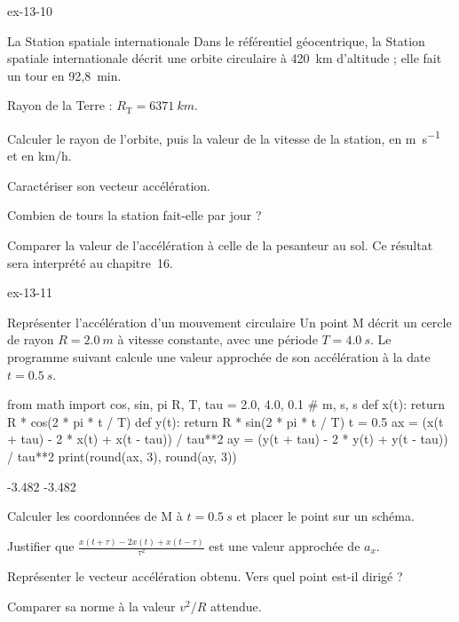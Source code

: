\begin{blocLivre}{ex-13-10}
\begin{exercice}[2]{La Station spatiale internationale}
Dans le référentiel géocentrique, la Station spatiale internationale décrit une orbite circulaire à 420~km d'altitude ;
elle fait un tour en 92,8~min.
\begin{donnees}
Rayon de la Terre : $R_\mathrm{T}=\qty{6371}{km}$.
\end{donnees}
\begin{questions}
\item Calculer le rayon de l'orbite, puis la valeur de la vitesse de la station, en \unit{m.s^{-1}} et en km/h.
\item Caractériser son vecteur accélération.
\item Combien de tours la station fait-elle par jour ?
\item Comparer la valeur de l'accélération à celle de la pesanteur au sol. Ce résultat sera interprété au chapitre~16.
\end{questions}
\end{exercice}
\end{blocLivre}
\begin{blocLivre}{ex-13-11}
\begin{exercice}[2]{Représenter l'accélération d'un mouvement circulaire}
Un point M décrit un cercle de rayon $R=\qty{2,0}{m}$ à vitesse constante, avec une période $T=\qty{4,0}{s}$. Le
programme suivant calcule une valeur approchée de son accélération à la date $t=\qty{0,5}{s}$.
\begin{python}
from math import cos, sin, pi
R, T, tau = 2.0, 4.0, 0.1                 # m, s, s
def x(t): return R * cos(2 * pi * t / T)
def y(t): return R * sin(2 * pi * t / T)
t = 0.5
ax = (x(t + tau) - 2 * x(t) + x(t - tau)) / tau**2
ay = (y(t + tau) - 2 * y(t) + y(t - tau)) / tau**2
print(round(ax, 3), round(ay, 3))
\end{python}
\begin{console}
-3.482 -3.482
\end{console}
\begin{questions}
\item {}Calculer les coordonnées de M à $t=\qty{0,5}{s}$ et placer le point sur un schéma.
\item Justifier que $\frac{x(t+\tau)-2x(t)+x(t-\tau)}{\tau^2}$ est une valeur approchée de $a_x$.
\item Représenter le vecteur accélération obtenu. Vers quel point est-il dirigé ?
\item Comparer sa norme à la valeur $v^2/R$ attendue.
\end{questions}
\end{exercice}
\end{blocLivre}
